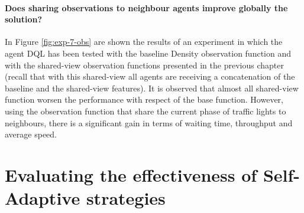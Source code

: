 
\paragraph{Does sharing observations to neighbour agents improve globally the solution?}

In Figure \ref{fig:exp-7-obs} are shown the results of an experiment in which the agent DQL has been tested with the baseline Density observation function and with the shared-view observation functions presented in the previous chapter (recall that with this shared-view all agents are receiving a concatenation of the baseline and the shared-view features).
It is observed that almost all shared-view function worsen the performance with respect of the base function.
However, using the observation function that share the current phase of traffic lights to neighbours, there is a significant gain in terms of waiting time, throughput and average speed.


% 

\section{Evaluating the effectiveness of Self-Adaptive strategies}

